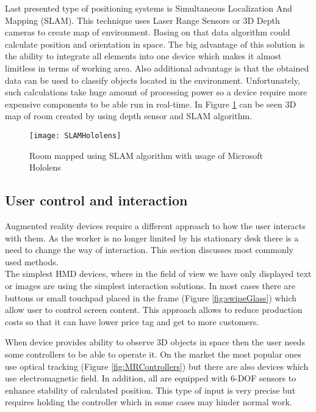 \documentclass[printmode,en]{mgr}
\begin{document}
Last presented type of positioning systems is Simultaneous Localization And Mapping (SLAM). This technique uses Laser Range Sensors or 3D Depth cameras to create map of environment. Basing on that data algorithm could calculate position and orientation in space. The big advantage of this solution is the ability to integrate all elements into one device which makes it almost limitless in terms of working area. Also additional advantage is that the obtained data can be used to classify objects located in the environment. Unfortunately, such calculations take huge amount of processing power so a device require more expensive components to be able run in real-time. In Figure \ref{fig:SLAMHololens} can be seen 3D map of room created by using depth sensor and SLAM algorithm.

\begin{figure}[!ht]
  \centering
    \texttt{[image: SLAMHololens]}
  \caption{Room mapped using SLAM algorithm with usage of Microsoft Hololens}
  \label{fig:SLAMHololens}
\end{figure}

\subsection{User control and interaction}
Augmented reality devices require a different approach to how the user interacts with them. As the worker is no longer limited by his stationary desk there is a need to change the way of interaction. This section discusses most commonly used methods.\\

The simplest HMD devices, where in the field of view we have only displayed text or images are using the simplest interaction solutions. In most cases there are buttons or small touchpad placed in the frame (Figure \ref{fig:swipeGlass}) which allow user to control screen content. This approach allows to reduce production costs so that it can have lower price tag and get to more customers.

When device provides ability to observe 3D objects in space then the user needs some controllers to be able to operate it. On the market the most popular ones use optical tracking (Figure \ref{fig:MRControllers}) but there are also devices which use electromagnetic field. In addition, all are equipped with 6-DOF sensors to enhance stability of calculated position. This type of input is very precise but requires holding the controller which in some cases may hinder normal work.
\end{document}
